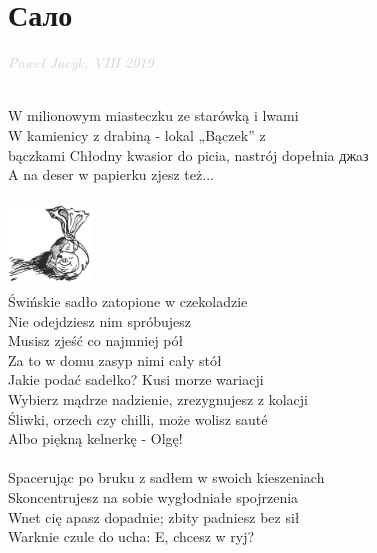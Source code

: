 \documentclass[a5paper, 10pt]{book}
\begin{document}
\section{\foreignlanguage{russian}{Сало}}\textcolor{lightgray}{\textit{Paweł Jacyk, VIII 2019}}\\~\\
\begin{minipage}[t]{0.8\textwidth}
  W milionowym miasteczku ze starówką i lwami	\\
  W kamienicy z drabiną - lokal „Bączek” z \\bączkami
  Chłodny kwasior do picia, nastrój dopełnia \foreignlanguage{russian}{джaз}\\
  A na deser w papierku zjesz też...\\
  \\
  \hspace*{6.5cm}\includegraphics[height=2.2cm]{images/salo.png}\vspace*{-2.21cm}\\
  \hspace*{5mm}Świńskie sadło zatopione w czekoladzie	\\
  \hspace*{5mm}Nie odejdziesz nim spróbujesz			\\
  \hspace*{5mm}Musisz zjeść co najmniej pół			\\
  \hspace*{5mm}Za to w domu zasyp nimi cały stół		\\

  Jakie podać sadełko? Kusi morze wariacji\\
  Wybierz mądrze nadzienie, zrezygnujesz z kolacji\\
  Śliwki, orzech czy chilli, może wolisz sauté\\
  Albo piękną kelnerkę - Olgę!\\
  \\
  Spacerując po bruku z sadłem w swoich kieszeniach\\
  Skoncentrujesz na sobie wygłodniałe spojrzenia\\
  Wnet cię apasz dopadnie; zbity padniesz bez sił\\
  Warknie czule do ucha: E, chcesz w ryj?\\
\end{minipage}
\end{document}
